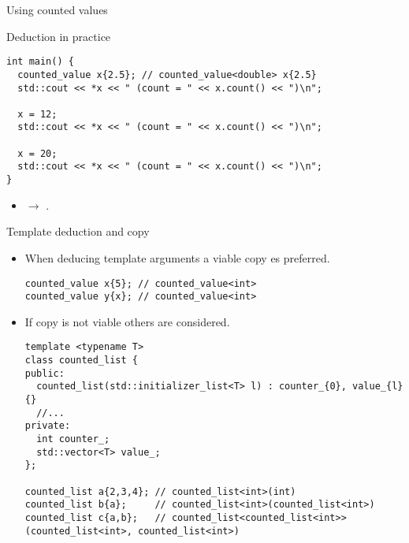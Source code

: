 \begin{frame}[t,fragile]{Using counted values}

\begin{block}{Deduction in practice}
\begin{lstlisting}
int main() {
  counted_value x{2.5}; // counted_value<double> x{2.5}
  std::cout << *x << " (count = " << x.count() << ")\n";

  x = 12;
  std::cout << *x << " (count = " << x.count() << ")\n";

  x = 20;
  std::cout << *x << " (count = " << x.count() << ")\n";
}
\end{lstlisting}
\end{block}

\begin{itemize}
  \item {} $\rightarrow$ .
\end{itemize}

\end{frame}

\begin{frame}[t,fragile,shrink=10]{Template deduction and copy}
\begin{itemize}
  \item When deducing template arguments a viable copy es preferred.
\begin{lstlisting}
counted_value x{5}; // counted_value<int>
counted_value y{x}; // counted_value<int>	
\end{lstlisting}

  \item If copy is not viable others are considered.
\begin{lstlisting}
template <typename T>
class counted_list {
public:
  counted_list(std::initializer_list<T> l) : counter_{0}, value_{l} {}
  //...
private:
  int counter_;
  std::vector<T> value_;
};

counted_list a{2,3,4}; // counted_list<int>(int)
counted_list b{a};     // counted_list<int>(counted_list<int>)
counted_list c{a,b};   // counted_list<counted_list<int>>(counted_list<int>, counted_list<int>)
\end{lstlisting}

\end{itemize}
\end{frame}
